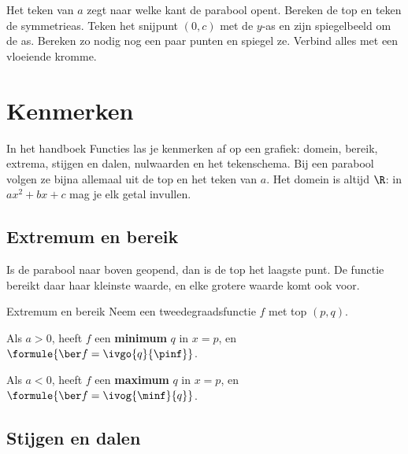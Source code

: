 \begin{werkwijze}
Het teken van $a$ zegt naar welke kant de parabool opent. Bereken de top en teken de symmetrieas. Teken het snijpunt $(0, c)$ met de $y$-as en zijn spiegelbeeld om de as. Bereken zo nodig nog een paar punten en spiegel ze. Verbind alles met een vloeiende kromme.
\end{werkwijze}

\begin{oefeningen}
\end{oefeningen}


\section{Kenmerken}

In het handboek Functies las je kenmerken af op een grafiek: domein, bereik, extrema, stijgen en dalen, nulwaarden en het tekenschema. Bij een parabool volgen ze bijna allemaal uit de top en het teken van $a$. Het domein is altijd $\R$: in $ax^2 + bx + c$ mag je elk getal invullen.

\subsection{Extremum en bereik}

Is de parabool naar boven geopend, dan is de top het laagste punt. De functie bereikt daar haar kleinste waarde, en elke grotere waarde komt ook voor.

\begin{theorie}
\begin{stelling}{Extremum en bereik}
Neem een tweedegraadsfunctie $f$ met top $(p, q)$.

\qquad Als $a > 0$, heeft $f$ een \textbf{\textcolor{accent}{minimum}} $q$ in $x = p$, en $\formule{\ber f = \ivgo{q}{\pinf}}$.

\qquad Als $a < 0$, heeft $f$ een \textbf{\textcolor{accent}{maximum}} $q$ in $x = p$, en $\formule{\ber f = \ivog{\minf}{q}}$.
\end{stelling}
\end{theorie}

\subsection{Stijgen en dalen}


